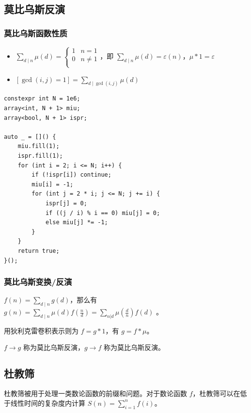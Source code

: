 \documentclass[UTF8, twoside]{ctexart}
\begin{document}
\begin{sloppypar}
\subsection{莫比乌斯反演}

\subsubsection{莫比乌斯函数性质}

\begin{itemize}
   \item $\sum_{d\mid n}\mu(d)=\begin{cases}1&n=1\\0&n\neq 1\\\end{cases}$，即 $\sum_{d\mid n}\mu(d)=\varepsilon(n)$，$\mu * 1 =\varepsilon$
   \item $\displaystyle [\gcd(i,j)=1]=\sum_{d\mid\gcd(i,j)}\mu(d)$
\end{itemize}

\begin{lstlisting}[style=cpp]
constexpr int N = 1e6;
array<int, N + 1> miu;
array<bool, N + 1> ispr;

auto _ = []() {
    miu.fill(1);
    ispr.fill(1);
    for (int i = 2; i <= N; i++) {
        if (!ispr[i]) continue;
        miu[i] = -1;
        for (int j = 2 * i; j <= N; j += i) {
            ispr[j] = 0;
            if ((j / i) % i == 0) miu[j] = 0;
            else miu[j] *= -1;
        }
    }
    return true;
}();
\end{lstlisting}

\subsubsection{莫比乌斯变换/反演}

$f(n)=\sum_{d\mid n}g(d)$，那么有 $g(n)=\sum_{d\mid n}\mu(d)f(\frac{n}{d})=\sum_{n|d}\mu(\frac{d}{n})f(d)$
。

用狄利克雷卷积表示则为 $f=g\ast1$，有 $g=f\ast\mu$。

$f \rightarrow g$ 称为莫比乌斯反演，$g \rightarrow f$ 称为莫比乌斯反演。

\subsection{杜教筛}

杜教筛被用于处理一类数论函数的前缀和问题。对于数论函数 $f$，杜教筛可以在低于线性时间的复杂度内计算 $S(n)=\sum_{i=1}^{n}f(i)$。


\end{sloppypar}
\end{document}
